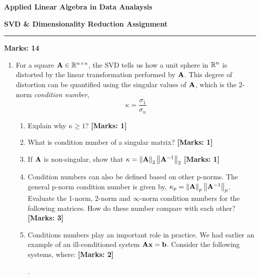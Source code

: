 \documentclass[12pt]{article}
\def\mf{\ensuremath\mathbf}
\def\mb{\ensuremath\mathbb}
\def\lV{\ensuremath\left\lVert}
\def\rV{\ensuremath\right\rVert}
\def\bmx{\ensuremath\begin{bmatrix*}[r]}
\def\emx{\ensuremath\end{bmatrix*}}
\begin{document}
\begin{center}
\begin{large}
\textbf{Applied Linear Algebra in Data Analaysis}\\
\vspace{0.1cm}
\end{large}
\textbf{SVD \& Dimensionality Reduction Assignment}
\end{center}
\hrule
\vspace{1em}

\begin{large}
    \textbf{Marks: 14}
\end{large}

\begin{enumerate}
    \item For a square $\mf{A} \in\mb{R}^{n \times n}$, the SVD tells us how a unit sphere in $\mb{R}^n$ is distorted by the linear transformation performed by $\mf{A}$. This degree of distortion can be quantified using the singular values of $\mf{A}$, which is the 2-norm \textit{condition number},
    \[ \kappa = \frac{\sigma_1}{\sigma_n} \]
    \begin{enumerate}
        \item Explain why $\kappa \geq 1$? \textbf{[Marks: 1]}
        \item What is condition number of a singular matrix? \textbf{[Marks: 1]}
        \item If $\mf{A}$ is non-singular, show that $\kappa = \lV\mf{A}\rV_2\lV\mf{A}^{-1}\rV_2$ \textbf{[Marks: 1]}
        \item Condition numbers can also be defined based on other p-norms. The general p-norm condition number is given by, $\kappa_p = \lV\mf{A}\rV_p\lV\mf{A}^{-1}\rV_p$. Evaluate the 1-norm, 2-norm and $\infty$-norm condition numbers for the following matrices. How do these number compare with each other? \textbf{[Marks: 3]}
        \item Conditions numbers play an important role in practice. We had earlier an example of an ill-conditioned system $\mf{Ax} = \mf{b}$. Consider the following systems, where: \textbf{[Marks: 2]}
        .


\end{enumerate}
\end{enumerate}
\end{document}
